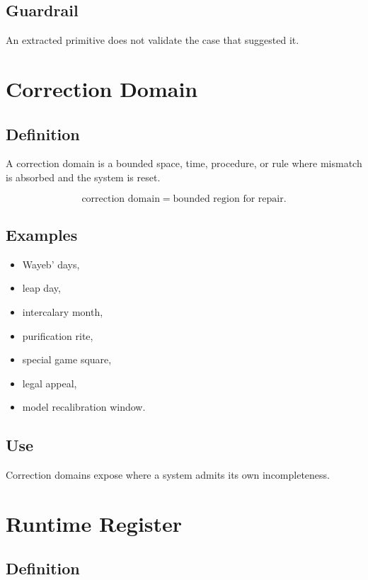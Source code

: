 \documentclass[11pt]{book}
\begin{document}
\subsection*{Guardrail}

An extracted primitive does not validate the case that suggested it.

\section{Correction Domain}

\subsection*{Definition}

A correction domain is a bounded space, time, procedure, or rule where mismatch is absorbed and the system is reset.

\[
\text{correction domain} = \text{bounded region for repair}.
\]

\subsection*{Examples}

\begin{itemize}
    \item Wayeb' days,
    \item leap day,
    \item intercalary month,
    \item purification rite,
    \item special game square,
    \item legal appeal,
    \item model recalibration window.
\end{itemize}

\subsection*{Use}

Correction domains expose where a system admits its own incompleteness.

\section{Runtime Register}

\subsection*{Definition}
\end{document}
